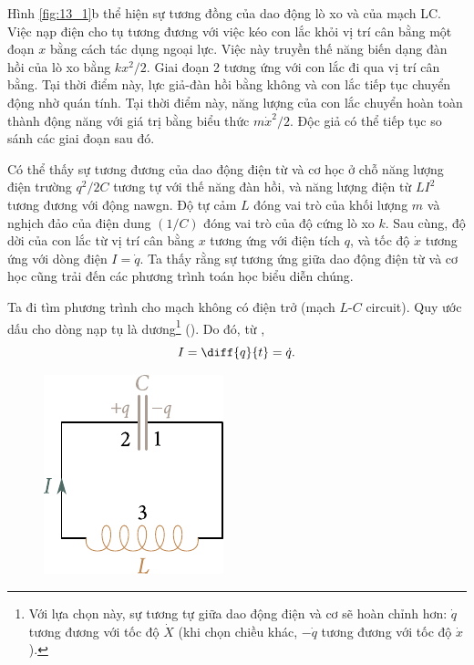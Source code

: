 Hình \ref{fig:13_1}b thể hiện sự tương đồng của dao động lò xo và của mạch LC.
Việc nạp điện cho tụ tương đương với việc kéo con lắc khỏi vị trí cân bằng một đoạn $x$ bằng cách tác dụng ngoại lực.
Việc này truyền thế năng biến dạng đàn hồi của lò xo bằng $kx^2/2$.
Giai đoạn 2 tương ứng với con lắc đi qua vị trí cân bằng.
Tại thời điểm này, lực giả-đàn hồi bằng không và con lắc tiếp tục chuyển động nhờ quán tính.
Tại thời điểm này, năng lượng của con lắc chuyển hoàn toàn thành động năng với giá trị bằng biểu thức $m\dot{x}^2/2$.
Độc giả có thể tiếp tục so sánh các giai đoạn sau đó.

Có thể thấy sự tương đương của dao động điện từ và cơ học ở chỗ năng lượng điện trường $q^2/2C$ tương tự với thế năng đàn hồi, và năng lượng điện từ $LI^2$ tương đương với động nawgn.
Độ tự cảm $L$ đóng vai trò của khối lượng $m$ và nghịch đảo của điện dung $(1/C)$ đóng vai trò của độ cứng lò xo $k$.
Sau cùng, độ dời của con lắc từ vị trí cân bằng $x$ tương ứng với điện tích $q$, và tốc độ $\dot{x}$ tương ứng với dòng điện $I = \dot{q}$.
Ta thấy rằng sự tương ứng giữa dao động điện từ và cơ học cũng trải đến các phương trình toán học biểu diễn chúng.

Ta đi tìm phương trình cho mạch không có điện trở (mạch $L$-$C$ circuit).
Quy ước dấu cho dòng nạp tụ là dương\footnote{Với lựa chọn này, sự tương tự giữa dao động điện và cơ sẽ hoàn chỉnh hơn: $\dot{q}$ tương đương với tốc độ $\dot{X}$ (khi chọn chiều khác, $-\dot{q}$ tương đương với tốc độ $\dot{x}$).} ().
Do đó, từ ,
\begin{equation*}
    I = \diff{q}{t} = \dot{q}.
\end{equation*}

\begin{figure}[t]
	\begin{center}
		\includegraphics[scale=1]{figures/ch_13/fig_13_2.pdf}
		\caption[]{}
		\label{fig:13_2}
	\end{center}
	\vspace{-0.8cm}
\end{figure}

